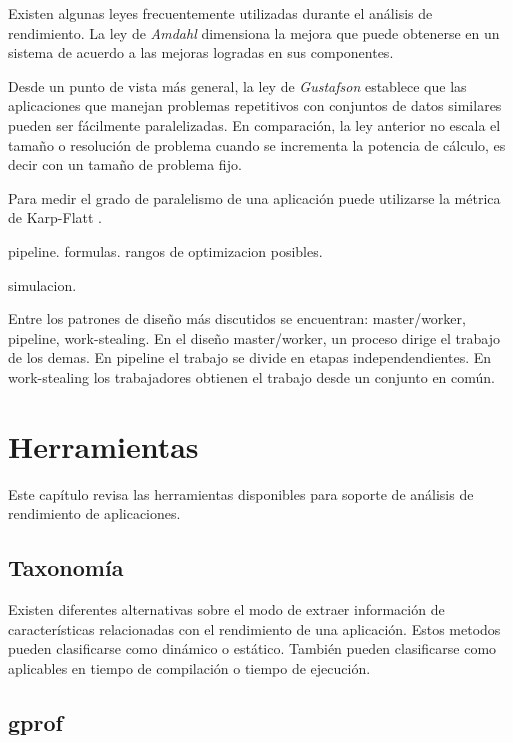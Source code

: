 \documentclass[a4paper]{report}
\begin{document}
\bigskip

Existen algunas leyes frecuentemente utilizadas durante el an\'alisis de
rendimiento. La ley de {\it Amdahl} \cite{amdahl} dimensiona la mejora que
puede obtenerse en un sistema de acuerdo a las mejoras logradas en sus
componentes.

\bigskip

Desde un punto de vista m\'as general, la ley de {\it Gustafson}
\cite{gustafson} establece que las aplicaciones que manejan problemas
repetitivos con conjuntos de datos similares pueden ser f\'acilmente
paralelizadas. En comparaci\'on, la ley anterior no escala el tama\~no o
resoluci\'on de problema cuando se incrementa la potencia de c\'alculo, es
decir con un tama\~no de problema fijo.

\bigskip

Para medir el grado de paralelismo de una aplicaci\'on puede utilizarse la
m\'etrica de Karp-Flatt \cite{karp-flatt}.

pipeline. formulas. rangos de optimizacion posibles.

simulacion.

\bigskip

Entre los patrones de dise\~no m\'as discutidos se encuentran: master/worker,
pipeline, work-stealing. En el dise\~no master/worker, un proceso dirige el
trabajo de los demas. En pipeline el trabajo se divide en etapas
independendientes. En work-stealing los trabajadores obtienen el trabajo desde
un conjunto en com\'un.

\chapter{Herramientas}

Este cap\'itulo revisa las herramientas disponibles para soporte de an\'alisis
de rendimiento de aplicaciones.

\section{Taxonom\'ia}

Existen diferentes alternativas sobre el modo de extraer informaci\'on de
caracter\'isticas relacionadas con el rendimiento de una aplicaci\'on.
Estos metodos pueden clasificarse como din\'amico o est\'atico.
Tambi\'en pueden clasificarse como aplicables en tiempo de compilaci\'on o
tiempo de ejecuci\'on.

\section{gprof}
\end{document}
